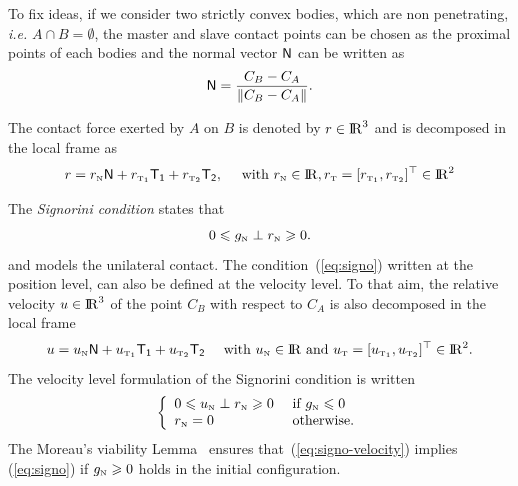 To fix ideas, if we consider two strictly convex bodies, which are non penetrating, {\it i.e.}  $A \cap B = \emptyset$, the master and slave contact points can be chosen as the proximal points of each bodies and the normal vector  ${\sf N}$ can be written as
\begin{equation}
  \label{eq:normal}
  {\sf N} = \Frac{C_B-C_A}{\|C_B-C_A\|}.
\end{equation}



The contact force exerted by $A$ on $B$ is denoted by $r \in \mathrm{I\!R}^3$ and is decomposed in the local frame as
\begin{equation}
  \label{eq:reaction}
  r = r_{\n} {\sf N} +   r_{\tone}{\sf T_1} + r_{\ttwo}{\sf T_2}  ,\quad \text{ with  } r_{\n} \in \RR, r_{\t}=[r_{\tone},r_{\ttwo}]^\top \in \RR^2
\end{equation}

The \textit{Signorini condition} states that
\begin{equation}
  \label{eq:signo}
  0 \leq g_{\n} \perp r_\n \geq 0.
\end{equation}
 and models the unilateral contact. The condition~(\ref{eq:signo}) written at the position level, can also be defined at the velocity level. To that aim, the relative velocity $u \in \mathrm{I\!R}^3$ of the point $C_{B}$ with respect to $C_{A}$ is also decomposed in the local frame
\begin{equation}
  \label{eq:velocity}
  u =  u_\n {\sf N} +  u_{\tone}{\sf T_1} + u_{\ttwo}{\sf T_2}  \quad \text{ with } u_\n \in \RR \text{ and } u_\t=[u_{\tone},u_{\ttwo}]^\top  \in \RR^2.
\end{equation}
The velocity level formulation of the Signorini condition is written 
\begin{equation}
  \label{eq:signo-velocity}
  \left\{\begin{array}{ll}
  0 \leq u_{\n} \perp r_\n \geq 0  &\text{ if } g_{\n} \leq 0 \\
  r_{\n} =0 &\text{ otherwise}.
\end{array}\right.
\end{equation}
The Moreau's viability Lemma~\cite{Moreau1988} ensures that~(\ref{eq:signo-velocity}) implies (\ref{eq:signo}) if $g_{{\hbox{\tiny{N}}}}\geqslant 0$ holds in the initial configuration.

